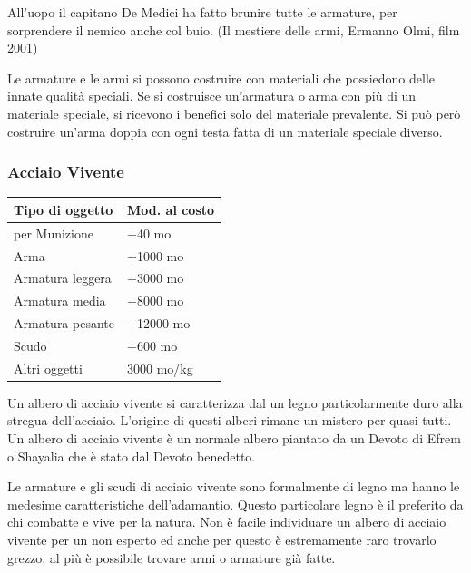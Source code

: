 \begin{changemargin}{0.3cm}{0.3cm}\begin{enfasi}{
All'uopo il capitano De Medici ha fatto brunire tutte le armature, per sorprendere il nemico anche col buio. (Il mestiere delle armi, Ermanno Olmi, film 2001)}\end{enfasi}\end{changemargin}\medskip

\begin{multicols}{2}

Le armature e le armi si possono costruire con materiali che possiedono delle innate qualità speciali. Se si costruisce un'armatura o arma con più di un materiale speciale, si ricevono i benefici solo del materiale prevalente. Si può però costruire un'arma doppia con ogni testa fatta di un materiale speciale diverso.

\subsubsection{Acciaio Vivente}

\label{acciaio-vivente}

\begin{tabularx}{0.45\textwidth}{Xl}
\textbf{Tipo di oggetto} & \textbf{Mod. al costo}\\
\toprule
per Munizione & +40 mo \\
Arma & +1000 mo\\
Armatura leggera & +3000 mo\\
Armatura media & +8000 mo\\
Armatura pesante & +12000 mo\\
Scudo & +600 mo\\
Altri oggetti & 3000 mo/kg
\end{tabularx}

\medskip
Un albero di acciaio vivente si caratterizza dal un legno particolarmente duro alla stregua dell'acciaio. L'origine di questi alberi rimane un mistero per quasi tutti. Un albero di acciaio vivente è un normale albero piantato da un Devoto di Efrem o Shayalia che è stato dal Devoto benedetto.

Le armature e gli scudi di acciaio vivente sono formalmente di legno ma hanno le medesime caratteristiche dell'adamantio. Questo particolare legno è il preferito da chi combatte e vive per la natura. Non è facile individuare un albero di acciaio vivente per un non esperto ed anche per questo è estremamente raro trovarlo grezzo, al più è possibile trovare armi o armature già fatte.


\end{multicols}
